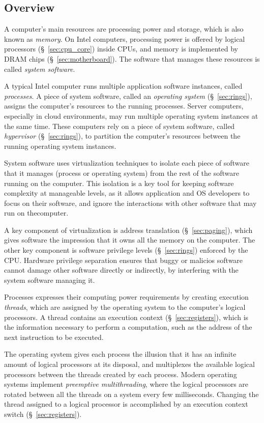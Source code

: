 \subsection{Overview}
\label{sec:background_overview}

A computer's main resources are processing power and storage, which is also
known as \textit{memory}. On Intel computers, processing power is offered by
logical processors (\S~\ref{sec:cpu_core}) inside CPUs, and memory is
implemented by DRAM chips (\S~\ref{sec:motherboard}). The software that manages
these resources is called \textit{system software}.

A typical Intel computer runs multiple application software instances, called
\textit{processes}. A piece of system software, called an
\textit{operating system} (\S~\ref{sec:rings}), assigns the computer's
resources to the running processes. Server computers, especially in cloud
environments, may run multiple operating system instances at the same time.
These computers rely on a piece of system software, called \textit{hypervisor}
(\S~\ref{sec:rings}), to partition the computer's resources between the running
operating system instances.

System software uses virtualization techniques to isolate each piece of
software that it manages (process or operating system) from the rest of the
software running on the computer. This isolation is a key tool for keeping
software complexity at manageable levels, as it allows application and OS
developers to focus on their software, and ignore the interactions with other
software that may run on thecomputer.

A key component of virtualization is address translation (\S~\ref{sec:paging}),
which gives software the impression that it owns all the memory on the
computer. The other key component is software privilege levels
(\S~\ref{sec:rings}) enforced by the CPU. Hardware privilege separation ensures
that buggy or malicios software cannot damage other software directly or
indirectly, by interfering with the system software managing it.

Processes expresses their computing power requirements by creating execution
\textit{threads}, which are assigned by the operating system to the computer's
logical processors. A thread contains an execution context
(\S~\ref{sec:registers}), which is the information necessary to perform a
computation, such as the address of the next instruction to be executed.

The operating system gives each process the illusion that it has an
infinite amount of logical processors at its disposal, and multiplexes the
available logical processors between the threads created by each process.
Modern operating systems implement \textit{preemptive multithreading}, where
the logical processors are rotated between all the threads on a system every
few milliseconds. Changing the thread assigned to a logical processor is
accomplished by an execution context switch (\S~\ref{sec:registers}).

